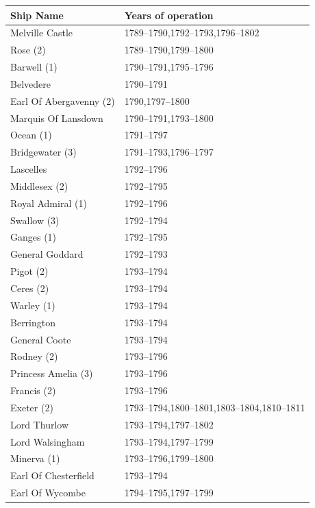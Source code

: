 \documentclass[CP]{copernicus}
\begin{document}
\begin{table}[!hbp]
\begin{minipage}[b]{0.5\linewidth}\centering
{\scriptsize
\begin{tabular}{|p{3.5cm}|p{3.5cm}|}
\hline 
{\bf Ship Name} & {\bf Years of operation} \\ 
\hline
Melville Castle & 1789--1790,1792--1793,1796--1802\\
\hline
Rose (2) & 1789--1790,1799--1800\\
\hline
Barwell (1) & 1790--1791,1795--1796\\
\hline
Belvedere & 1790--1791\\
\hline
Earl Of Abergavenny (2) & 1790,1797--1800\\
\hline
Marquis Of Lansdown & 1790--1791,1793--1800\\
\hline
Ocean (1) & 1791--1797\\
\hline
Bridgewater (3) & 1791--1793,1796--1797\\
\hline
Lascelles & 1792--1796\\
\hline
Middlesex (2) & 1792--1795\\
\hline
Royal Admiral (1) & 1792--1796\\
\hline
Swallow (3) & 1792--1794\\
\hline
Ganges (1) & 1792--1795\\
\hline
General Goddard & 1792--1793\\
\hline
Pigot (2) & 1793--1794\\
\hline
Ceres (2) & 1793--1794\\
\hline
Warley (1) & 1793--1794\\
\hline
Berrington & 1793--1794\\
\hline
General Coote & 1793--1794\\
\hline
Rodney (2) & 1793--1796\\
\hline
Princess Amelia (3) & 1793--1796\\
\hline
Francis (2) & 1793--1796\\
\hline
Exeter (2) & 1793--1794,1800--1801,1803--1804,1810--1811\\
\hline
Lord Thurlow & 1793--1794,1797--1802\\
\hline
Lord Walsingham & 1793--1794,1797--1799\\
\hline
Minerva (1) & 1793--1796,1799--1800\\
\hline
Earl Of Chesterfield & 1793--1794\\
\hline
Earl Of Wycombe & 1794--1795,1797--1799\\

\end{tabular}}
\end{minipage}
\end{table}
\end{document}
